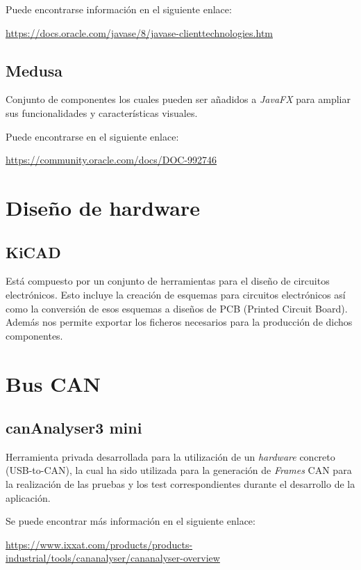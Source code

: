 Puede encontrarse información en el siguiente enlace:

\url{https://docs.oracle.com/javase/8/javase-clienttechnologies.htm}

\subsection{Medusa}\label{medusa}

Conjunto de componentes los cuales pueden ser añadidos a \emph{JavaFX} para ampliar sus funcionalidades y características visuales.

Puede encontrarse en el siguiente enlace:

\url{https://community.oracle.com/docs/DOC-992746}


\section{Diseño de hardware}\label{diseño_de_hardware}

\subsection{KiCAD}\label{kicad}

Está compuesto por un conjunto de herramientas para el diseño de circuitos electrónicos. Esto incluye la creación de esquemas para circuitos electrónicos así como la conversión de esos esquemas a diseños de PCB (Printed Circuit Board). Además nos permite exportar los ficheros necesarios para la producción de dichos componentes.


\section{Bus CAN}\label{bus_can}

\subsection{canAnalyser3 mini}\label{canalyser3_mini}

Herramienta privada desarrollada para la utilización de un \emph{hardware} concreto (USB-to-CAN), la cual ha sido utilizada para la generación de \emph{Frames} CAN para la realización de las pruebas y los test correspondientes durante el desarrollo de la aplicación.

Se puede encontrar más información en el siguiente enlace:

\url{https://www.ixxat.com/products/products-industrial/tools/cananalyser/cananalyser-overview}

